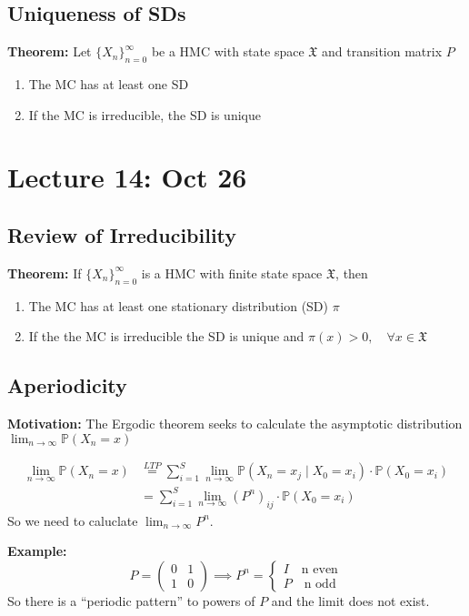 \documentclass[12pt]{article}
\renewcommand{\P}{\mathbb{P}}
\newcommand{\mfX}{\mathfrak{X}}
\begin{document}
\subsection{Uniqueness of SDs}
\textbf{Theorem:} Let $\{X_n\}_{n=0}^\infty$ be a HMC with state space $\mfX$ and transition matrix $P$
\begin{enumerate}
    \item The MC has at least one SD 
    \item If the MC is irreducible, the SD is unique 
\end{enumerate}

\section{Lecture 14: Oct 26}
    \subsection{Review of Irreducibility}
        \textbf{Theorem:} If $\{X_n\}_{n=0}^\infty$ is a HMC with finite state space $\mfX$, then
        \begin{enumerate}
            \item The MC has at least one stationary distribution (SD) $\pi$
            \item If the the MC is irreducible the SD is unique and $\pi(x) > 0, \quad \forall x \in \mfX$ 
        \end{enumerate}

    \subsection{Aperiodicity}
        \textbf{Motivation:} The Ergodic theorem seeks to calculate the asymptotic distribution $\lim_{n\to\infty} \P(X_n = x)$ 

        \begin{align*}
            \lim_{n\to\infty} \P(X_n = x) &\overset{LTP}{=} \sum_{i=1}^S \lim_{n\to \infty} \P(X_n = x_j \; | \; X_0 = x_i) \cdot \P(X_0 = x_i)\\
            &= \sum_{i=1}^S \lim_{n\to \infty} (P^n)_{ij} \cdot \P(X_0 = x_i)
        \end{align*}
        So we need to caluclate $\lim_{n\to \infty} P^n$. 

        \textbf{Example:} 
        \[P = \begin{pmatrix}
            0 & 1\\
            1 & 0
        \end{pmatrix} \implies P^n = \begin{cases}
            I \quad \text{n even}\\
            P \quad \text{n odd}
        \end{cases}\] 
        So there is a ``periodic pattern'' to powers of $P$ and the limit does not exist. 
\end{document}
